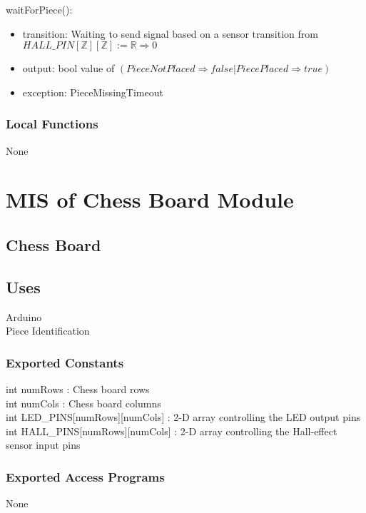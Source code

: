 \documentclass[12pt, titlepage]{article}
\begin{document}
\noindent waitForPiece():
\begin{itemize}
\item transition: Waiting to send signal based on a sensor transition from\\$HALL\_PIN[\mathbb{Z}][\mathbb{Z}] := \mathbb{R} \Rightarrow 0$
\item output: bool value of $(Piece Not Placed \Rightarrow false | Piece Placed \Rightarrow true)$
\item exception: PieceMissingTimeout
\end{itemize}

\subsubsection{Local Functions}{
  None
}

\newpage

\section{MIS of Chess Board Module} \label{ChessBoardModule} 

\subsection{Chess Board}

\subsection{Uses}
Arduino\\
Piece Identification\\

\subsubsection{Exported Constants}{
int numRows : Chess board rows \\
int numCols : Chess board columns \\
int LED\_PINS[numRows][numCols] : 2-D array controlling the LED output pins \\
int HALL\_PINS[numRows][numCols] : 2-D array controlling the Hall-effect sensor input pins \\
}

\subsubsection{Exported Access Programs}{
  None
}
\end{document}
